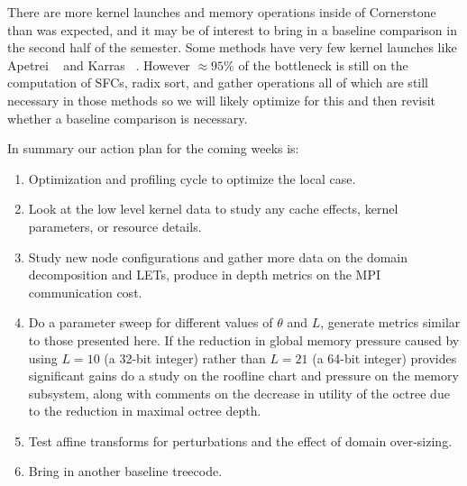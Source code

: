 There are more kernel launches and memory operations inside of Cornerstone than was expected, and it may be of interest to bring in a baseline comparison in the second half of the semester. Some methods have very few kernel launches like Apetrei ~\cite{lbvh} and Karras ~\cite{karras}. However $\approx 95\%$ of the bottleneck is still on the computation of SFCs, radix sort, and gather operations all of which are still necessary in those methods so we will likely optimize for this and then revisit whether a baseline comparison is necessary.

In summary our action plan for the coming weeks is:
\begin{enumerate}
    \item Optimization and profiling cycle to optimize the local case.
    \item Look at the low level kernel data to study any cache effects, kernel parameters, or resource details.
    \item Study new node configurations and gather more data on the domain decomposition and LETs, produce in depth metrics on the MPI communication cost.
    \item Do a parameter sweep for different values of $\theta$ and $L$, generate metrics similar to those presented here. If the reduction in global memory pressure caused by using $L = 10$ (a 32-bit integer) rather than $L = 21$ (a 64-bit integer) provides significant gains do a study on the roofline chart and pressure on the memory subsystem, along with comments on the decrease in utility of the octree due to the reduction in maximal octree depth.
    \item Test affine transforms for perturbations and the effect of domain over-sizing.
    \item Bring in another baseline treecode.
\end{enumerate}

